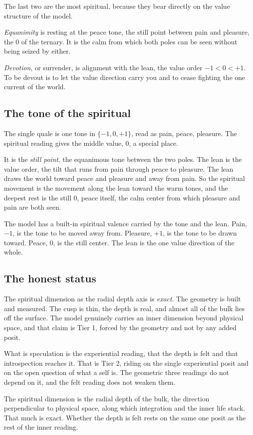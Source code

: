 The last two are the most spiritual, because they bear directly on the value structure of the model.

\emph{Equanimity} is resting at the peace tone, the still point between pain and pleasure, the $0$ of the ternary. It is the calm from which both poles can be seen without being seized by either.

\emph{Devotion}, or surrender, is alignment with the lean, the value order $-1 < 0 < +1$. To be devout is to let the value direction carry you and to cease fighting the one current of the world.

\subsection{The tone of the spiritual}

The single quale is one tone in $\{-1, 0, +1\}$, read as pain, peace, pleasure. The spiritual reading gives the middle value, $0$, a special place.

It is the \emph{still point}, the equanimous tone between the two poles. The lean is the value order, the tilt that runs from pain through peace to pleasure. The lean draws the world toward peace and pleasure and away from pain. So the spiritual movement is the movement along the lean toward the warm tones, and the deepest rest is the still $0$, peace itself, the calm center from which pleasure and pain are both seen.

\begin{result}
The model has a built-in spiritual valence carried by the tone and the lean. Pain, $-1$, is the tone to be moved away from. Pleasure, $+1$, is the tone to be drawn toward. Peace, $0$, is the still center. The lean is the one value direction of the whole.
\end{result}

\subsection{The honest status}

The spiritual dimension as the radial depth axis is \emph{exact}. The geometry is built and measured. The cusp is thin, the depth is real, and almost all of the bulk lies off the surface. The model genuinely carries an inner dimension beyond physical space, and that claim is Tier 1, forced by the geometry and not by any added posit.

What is speculation is the experiential reading, that the depth is felt and that introspection reaches it. That is Tier 2, riding on the single experiential posit and on the open question of what a self is. The geometric three readings do not depend on it, and the felt reading does not weaken them.

\begin{principle}
The spiritual dimension is the radial depth of the bulk, the direction perpendicular to physical space, along which integration and the inner life stack. That much is exact. Whether the depth is felt rests on the same one posit as the rest of the inner reading.
\end{principle}
